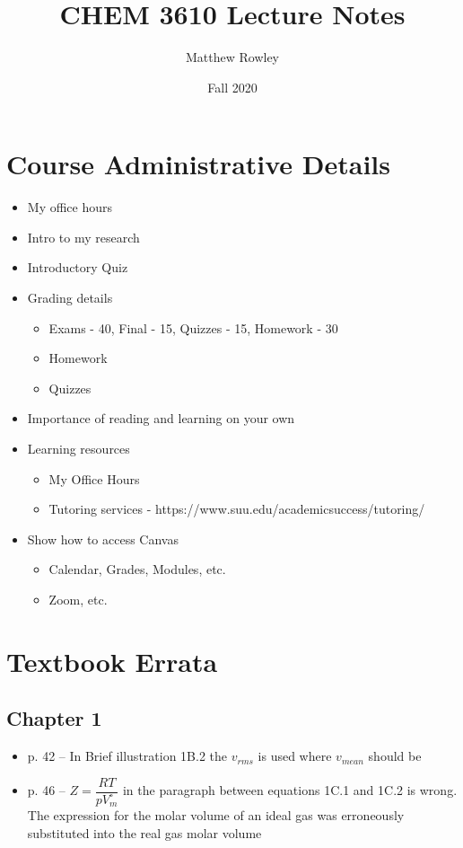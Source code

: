 \documentclass[12pt, openany, letterpaper]{memoir}
\begin{document}
\title{CHEM 3610 Lecture Notes}
\author{Matthew Rowley}
\date{Fall 2020}
\mainmatter
\maketitle

\chapter*{Course Administrative Details}
\begin{itemize}
	\item My office hours
	\item Intro to my research
	\item Introductory Quiz
	\item Grading details
	      \begin{itemize}
		      \item Exams - 40, Final - 15, Quizzes - 15, Homework - 30
		      \item Homework
		      \item Quizzes
	      \end{itemize}
	\item Importance of reading and learning on your own
	\item Learning resources
	      \begin{itemize}
		      \item My Office Hours
		      \item Tutoring services - https://www.suu.edu/academicsuccess/tutoring/
	      \end{itemize}
	\item Show how to access Canvas
	      \begin{itemize}
		      \item Calendar, Grades, Modules, etc.
		      \item Zoom, etc.
	      \end{itemize}
\end{itemize}

\chapter*{Textbook Errata}
\section*{Chapter 1}
\begin{itemize}
	\item p. 42 -- In Brief illustration 1B.2 the $v_{rms}$ is used where $v_{mean}$ should be
	\item p. 46 -- $Z = \dfrac{RT}{pV_m^\circ}$ in the paragraph between equations 1C.1 and 1C.2 is wrong. The expression for the molar volume of an ideal gas was erroneously substituted into the real gas molar volume
\end{itemize}
\end{document}
